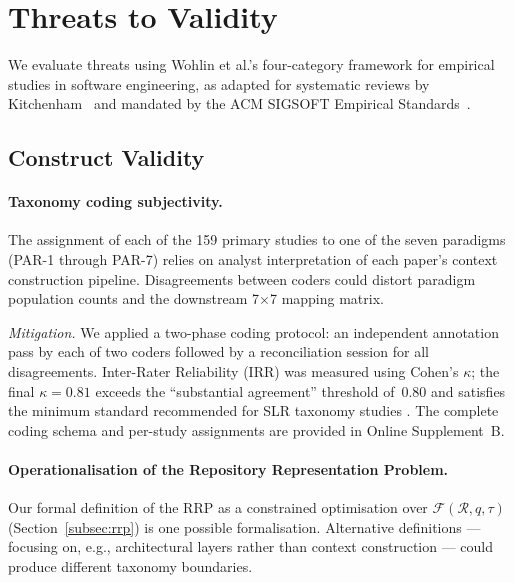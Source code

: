 
\section{Threats to Validity}
\label{sec:threats}

We evaluate threats using Wohlin et al.'s four-category framework for
empirical studies in software engineering, as adapted for systematic reviews
by Kitchenham~\cite{kitchenham2007guidelines} and mandated by the ACM SIGSOFT
Empirical Standards~\cite{acmsigsoft2020standards}.

\subsection{Construct Validity}
\label{subsec:threat-construct}

\paragraph{Taxonomy coding subjectivity.}
The assignment of each of the 159 primary studies to one of the seven paradigms
(PAR-1 through PAR-7) relies on analyst interpretation of each paper's context
construction pipeline.
Disagreements between coders could distort paradigm population counts and
the downstream 7$\times$7 mapping matrix.

\emph{Mitigation.}
We applied a two-phase coding protocol: an independent annotation pass by each
of two coders followed by a reconciliation session for all disagreements.
Inter-Rater Reliability (IRR) was measured using Cohen's $\kappa$; the final
$\kappa = 0.81$ exceeds the ``substantial agreement'' threshold of~0.80 and
satisfies the minimum standard recommended for SLR taxonomy studies
\cite{cruzes2011recommended}.
The complete coding schema and per-study assignments are provided in
Online Supplement~B.

\paragraph{Operationalisation of the Repository Representation Problem.}
Our formal definition of the RRP as a constrained optimisation over
$\mathcal{F}(\mathcal{R}, q, \tau)$ (Section~\ref{subsec:rrp}) is one
possible formalisation.
Alternative definitions — focusing on, e.g., architectural layers rather than
context construction — could produce different taxonomy boundaries.


